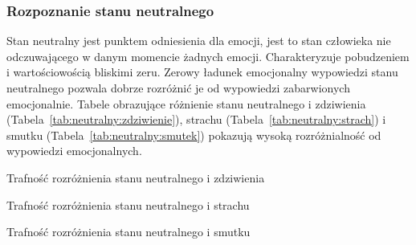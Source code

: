 \documentclass[a4paper,12pt,twoside,openany]{report}
\newcommand{\Tab}[1]{(Tabela~\ref{#1})}
\begin{document}
\subsubsection{Rozpoznanie stanu neutralnego}
Stan neutralny jest punktem odniesienia dla emocji, jest to stan człowieka nie odczuwającego w danym momencie żadnych emocji.
Charakteryzuje pobudzeniem i wartościowością bliskimi zeru.
Zerowy ładunek emocjonalny wypowiedzi stanu neutralnego pozwala dobrze rozróżnić je od wypowiedzi zabarwionych emocjonalnie. 
Tabele obrazujące różnienie stanu neutralnego i zdziwienia \Tab{tab:neutralny:zdziwienie}, strachu \Tab{tab:neutralny:strach} i smutku \Tab{tab:neutralny:smutek}
pokazują wysoką rozróżnialność od wypowiedzi emocjonalnych. 
\begin{table}[hc!]
	\centering
	
	\caption{Trafność rozróżnienia stanu neutralnego i zdziwienia}
	\label{tab:neutralny:zdziwienie}
\end{table}
\begin{table}[hc!]
	\centering
	
	\caption{Trafność rozróżnienia stanu neutralnego i strachu}
	\label{tab:neutralny:strach}
\end{table}
\begin{table}[hc!]
	\centering
	
	\caption{Trafność rozróżnienia stanu neutralnego i smutku}
	\label{tab:neutralny:smutek}
\end{table}
\end{document}
